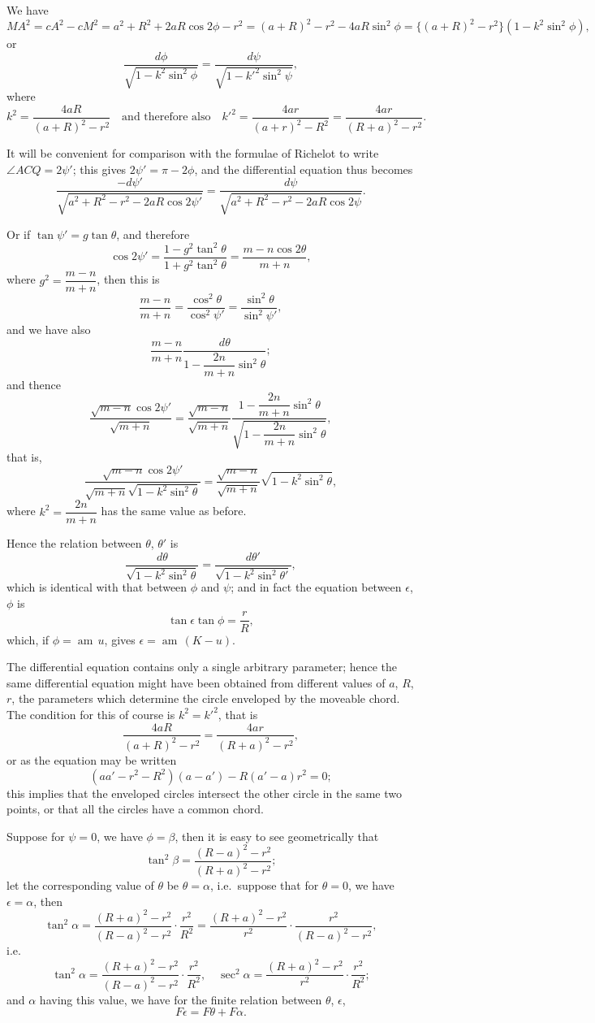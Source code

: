\documentclass[11pt,a4paper]{book}
\begin{document}
We have
\[
MA^2 = cA^2 - cM^2 = a^2 + R^2 + 2aR\cos 2\phi - r^2 = (a+R)^2 - r^2 - 4aR\sin^2\phi = \{(a+R)^2 - r^2\}(1 - k^2\sin^2\phi),
\]
or
\[
\frac{d\phi}{\sqrt{1-k^2\sin^2\phi}} = \frac{d\psi}{\sqrt{1-k'^2\sin^2\psi}},
\]
where
\[
k^2 = \frac{4aR}{(a+R)^2-r^2} \quad \text{and therefore also} \quad k'^2 = \frac{4ar}{(a+r)^2-R^2} = \frac{4ar}{(R+a)^2-r^2}.
\]

It will be convenient for comparison with the formulae of Richelot to write $\angle ACQ = 2\psi'$; this gives $2\psi' = \pi - 2\phi$, and the differential equation thus becomes
\[
\frac{-d\psi'}{\sqrt{a^2+R^2-r^2-2aR\cos 2\psi'}} = \frac{d\psi}{\sqrt{a^2+R^2-r^2-2aR\cos 2\psi}}.
\]

Or if $\tan\psi' = g\tan\theta$, and therefore
\[
\cos 2\psi' = \frac{1-g^2\tan^2\theta}{1+g^2\tan^2\theta} = \frac{m-n\cos 2\theta}{m+n},
\]
where $g^2 = \dfrac{m-n}{m+n}$, then this is
\[
\frac{m-n}{m+n} = \frac{\cos^2\theta}{\cos^2\psi'} = \frac{\sin^2\theta}{\sin^2\psi'},
\]
and we have also
\[
\frac{m-n}{m+n}\frac{d\theta}{1-\dfrac{2n}{m+n}\sin^2\theta};
\]
and thence
\[
\frac{\sqrt{m-n}\cos 2\psi'}{\sqrt{m+n}} = \frac{\sqrt{m-n}}{\sqrt{m+n}}\frac{1-\dfrac{2n}{m+n}\sin^2\theta}{\sqrt{1-\dfrac{2n}{m+n}\sin^2\theta}},
\]
that is,
\[
\frac{\sqrt{m-n}\cos 2\psi'}{\sqrt{m+n}\sqrt{1-k^2\sin^2\theta}} = \frac{\sqrt{m-n}}{\sqrt{m+n}}\sqrt{1-k^2\sin^2\theta},
\]
where $k^2 = \dfrac{2n}{m+n}$ has the same value as before.

Hence the relation between $\theta$, $\theta'$ is
\[
\frac{d\theta}{\sqrt{1-k^2\sin^2\theta}} = \frac{d\theta'}{\sqrt{1-k^2\sin^2\theta'}},
\]
which is identical with that between $\phi$ and $\psi$; and in fact the equation between $\epsilon$, $\phi$ is
\[
\tan\epsilon \tan\phi = \frac{r}{R},
\]
which, if $\phi = \operatorname{am}\,u$, gives $\epsilon = \operatorname{am}\,(K-u)$.

The differential equation contains only a single arbitrary parameter; hence the same differential equation might have been obtained from different values of $a$, $R$, $r$, the parameters which determine the circle enveloped by the moveable chord. The condition for this of course is $k^2 = k'^2$, that is
\[
\frac{4aR}{(a+R)^2-r^2} = \frac{4ar}{(R+a)^2-r^2},
\]
or as the equation may be written
\[
(aa' - r^2 - R^2)(a - a') - R(a' - a)r^2 = 0;
\]
this implies that the enveloped circles intersect the other circle in the same two points, or that all the circles have a common chord.
\newpage

Suppose for $\psi = 0$, we have $\phi = \beta$, then it is easy to see geometrically that
\[
\tan^2\beta = \frac{(R-a)^2-r^2}{(R+a)^2-r^2};
\]
let the corresponding value of $\theta$ be $\theta = \alpha$, i.e.\ suppose that for $\theta = 0$, we have $\epsilon = \alpha$, then
\[
\tan^2\alpha = \frac{(R+a)^2-r^2}{(R-a)^2-r^2} \cdot \frac{r^2}{R^2} = \frac{(R+a)^2-r^2}{r^2} \cdot \frac{r^2}{(R-a)^2-r^2},
\]
i.e.
\[
\tan^2\alpha = \frac{(R+a)^2-r^2}{(R-a)^2-r^2} \cdot \frac{r^2}{R^2}, \quad \sec^2\alpha = \frac{(R+a)^2-r^2}{r^2} \cdot \frac{r^2}{R^2};
\]
and $\alpha$ having this value, we have for the finite relation between $\theta$, $\epsilon$,
\[
F\epsilon = F\theta + F\alpha.
\]
\end{document}
